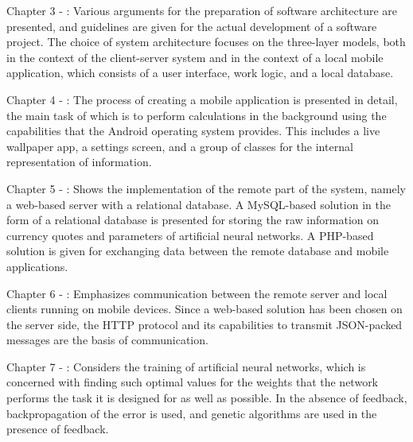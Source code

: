 Chapter 3 - : Various arguments for the preparation of software architecture are presented, and guidelines are given for the actual development of a software project. The choice of system architecture focuses on the three-layer models, both in the context of the client-server system and in the context of a local mobile application, which consists of a user interface, work logic, and a local database.

Chapter 4 - : The process of creating a mobile application is presented in detail, the main task of which is to perform calculations in the background using the capabilities that the Android operating system provides. This includes a live wallpaper app, a settings screen, and a group of classes for the internal representation of information.

Chapter 5 - : Shows the implementation of the remote part of the system, namely a web-based server with a relational database. A MySQL-based solution in the form of a relational database is presented for storing the raw information on currency quotes and parameters of artificial neural networks. A PHP-based solution is given for exchanging data between the remote database and mobile applications.

Chapter 6 - : Emphasizes communication between the remote server and local clients running on mobile devices. Since a web-based solution has been chosen on the server side, the HTTP protocol and its capabilities to transmit JSON-packed messages are the basis of communication.

Chapter 7 - : Considers the training of artificial neural networks, which is concerned with finding such optimal values for the weights that the network performs the task it is designed for as well as possible. In the absence of feedback, backpropagation of the error is used, and genetic algorithms are used in the presence of feedback.
